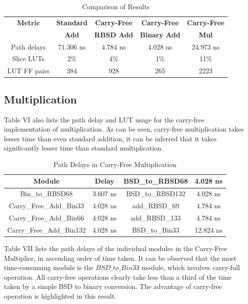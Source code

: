 \documentclass[conference]{IEEEtran_IBSS}
\begin{document}
\vspace{-.5em}
\begin{table}[h!]
  \centering
  \caption{Comparison of Results}
  \label{tab:table6}
  \begin{tabular}{|c|c|c|c|c|}
    \hline
    \textbf{Metric} & \textbf{Standard} & \textbf{Carry-Free} & \textbf{Carry-Free} & \textbf{Carry-Free} \\
    & \textbf{Add} & \textbf{RBSD Add} & \textbf{Binary Add} & \textbf{Mul} \\
    \hline
    \hline
    Path delays & 71.306 ns & 4.784 ns & 4.028 ns & 24.973 ns \\
    \hline
    Slice LUTs & 2\% & 4\% & 1\% & 11\% \\
    \hline
    LUT FF pairs & 384 & 928 & 265 & 2223 \\
    \hline
  \end{tabular}
\end{table}

\subsection{Multiplication}

Table VI also lists the path delay and LUT usage for the carry-free implementation of multiplication. As can be seen, carry-free multiplication takes lesser time than even standard addition, it can be inferred that it takes significantly lesser time than standard multiplication.

\vspace{-.5em}
\begin{table}[h!]
  \centering
  \caption{Path Delays in Carry-Free Multiplication}
  \label{tab:table7}
  \begin{tabular}{|c|c||c|c|}
    \hline
    \textbf{Module} & \textbf{Delay} & BSD\_to\_RBSD68 & 4.028 ns \\
    \hline
    Bin\_to\_RBSD68 & 3.607 ns & BSD\_to\_RBSD132 & 4.028 ns \\
    \hline
    Carry\_Free\_Add\_Bin33 & 4.028 ns & add\_RBSD\_69 & 4.784 ns \\
    \hline
    Carry\_Free\_Add\_Bin66 & 4.028 ns & add\_RBSD\_133 & 4.784 ns \\
    \hline
    Carry\_Free\_Add\_Bin132 & 4.028 ns & BSD\_to\_Bin33 & 12.824 ns \\
    \hline
  \end{tabular}
\end{table}

Table VII lists the path delays of the individual modules in the Carry-Free Multiplier, in ascending order of time taken. It can be observed that the most time-consuming module is the $BSD\_to\_Bin33$ module, which involves carry-full operation. All carry-free operations clearly take less than a third of the time taken by a simple BSD to binary conversion. The advantage of carry-free operation is highlighted in this result.
\end{document}

